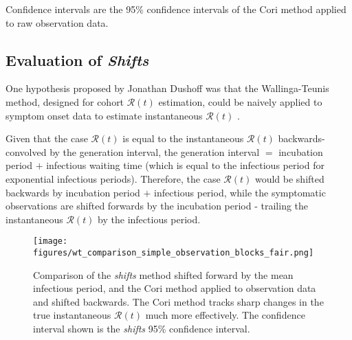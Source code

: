 \documentclass{article}
\newcommand{\nR}{\mathcal{R}}
\begin{document}
Confidence intervals are the 95\% confidence intervals of the Cori method applied to raw observation data. 

\subsection{Evaluation of \emph{Shifts}}
One hypothesis proposed by Jonathan Dushoff was that the Wallinga-Teunis method, designed for cohort $\nR(t)$ estimation, could be naively applied to symptom onset data to estimate instantaneous $\nR(t)$ \cite{shifts}. 

Given that the case $\nR(t)$ is equal to the instantaneous $\nR(t)$ backwards-convolved by the generation interval, the generation interval $=$ incubation period $+$ infectious waiting time (which is equal to the infectious period for exponential infectious periods). Therefore, the case $\nR(t)$ would be shifted backwards by incubation period $+$ infectious period, while the symptomatic observations are shifted forwards by the incubation period - trailing the instantaneous $\nR(t)$ by the infectious period.

\clearpage
\begin{figure}[h!]
\centering
\texttt{[image: figures/wt\_comparison\_simple\_observation\_blocks\_fair.png]}
\caption{Comparison of the \emph{shifts} method shifted forward by the mean infectious period, and the Cori method applied to observation data and shifted backwards. The Cori method tracks sharp changes in the true instantaneous $\nR(t)$ much more effectively. The confidence interval shown is the \emph{shifts} 95\% confidence interval.} 
\end{figure}
\end{document}
